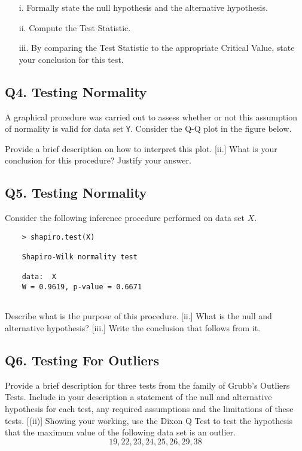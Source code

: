 \begin{itemize}
\item[i.]  Formally state the null hypothesis and the alternative hypothesis.
\item[ii.]  Compute the Test Statistic.
\item[iii.]  By comparing the Test Statistic to the appropriate Critical Value, state your conclusion for this test.
\end{itemize}

\subsection*{Q4. Testing Normality } %
A graphical procedure was carried out to assess whether or not this assumption of normality is valid for data set \texttt{Y}. Consider the Q-Q plot in the figure below.


\begin{itemize}
[i.]  Provide a brief description on how to interpret this plot.
[ii.]  What is your conclusion for this procedure? Justify your answer.
\end{itemize}

\subsection*{Q5. Testing Normality } %
Consider the following inference procedure performed on data set $X$.
\begin{center}
	\begin{verbatim}
	> shapiro.test(X)
	
	Shapiro-Wilk normality test
	
	data:  X
	W = 0.9619, p-value = 0.6671
	
	\end{verbatim}
\end{center}


\begin{itemize}
[i.]  Describe what is the purpose of this procedure.
[ii.]  What is the null and alternative hypothesis?
[iii.]  Write the conclusion that follows from it.
\end{itemize}

\subsection*{Q6. Testing For Outliers }
\begin{itemize}
[(i)]  Provide a brief description for three tests from the family of Grubb's  Outliers Tests. Include in your description a statement of the null and alternative hypothesis for each test, any required assumptions and the limitations of these tests.
[(ii)]  Showing your working, use the Dixon Q Test to test the hypothesis that the maximum value of the following data set is an outlier.
	\[ 19,22,23,24,25,26,29,38\]
\end{itemize}
\newpage
